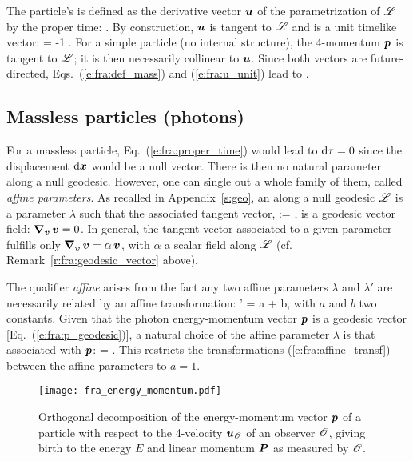 The particle's  is defined as the
derivative vector $\bm{u}$ of the parametrization of
$\mathscr{L}$ by the proper time:
\be \label{e:fra:def_u}
    .
\ee
By construction, $\bm{u}$ is tangent to $\mathscr{L}$ and is a unit timelike vector:
\be \label{e:fra:u_unit}
    \cdot{} = -1 .
\ee
For a simple particle (no internal structure),
the 4-momentum $\bm{p}$ is tangent to $\mathscr{L}$; it is then necessarily
collinear to $\bm{u}$. Since both vectors are future-directed,
Eqs.~(\ref{e:fra:def_mass}) and (\ref{e:fra:u_unit}) lead to
\be \label{e:fra:p_m_u}
   .
\ee

\subsection{Massless particles (photons)}

For a massless particle, Eq.~(\ref{e:fra:proper_time}) would lead to $\mathrm{d}\tau=0$
since the displacement $\mathrm{d}\bm{x}$ would be a null vector. There is then no natural parameter
along a null geodesic. However, one can single out a whole family of them,
called \emph{affine parameters}.
As recalled in Appendix~\ref{s:geo},
an 
along a null geodesic $\mathscr{L}$ is a parameter $\lambda$ such that
the associated tangent vector,
\be
     :=  ,
\ee
is a geodesic vector field: $\bm{\nabla}_{\bm{v}} \, \bm{v} = 0$. In general,
the tangent vector associated to a given parameter fulfills only
$\bm{\nabla}_{\bm{v}} \, \bm{v} = \alpha \, \bm{v}$, with $\alpha$ a scalar field
along $\mathscr{L}$ (cf. Remark~\ref{r:fra:geodesic_vector} above).

The qualifier \emph{affine} arises from the fact any two affine parameters
$\lambda$ and $\lambda'$ are necessarily related by an affine transformation:
\be \label{e:fra:affine_transf}
    \lambda' = a \lambda + b,
\ee
with $a$ and $b$ two constants.
Given that the photon energy-momentum vector $\bm{p}$ is a geodesic vector
[Eq.~(\ref{e:fra:p_geodesic})],
a natural choice of the affine parameter $\lambda$ is that associated with
$\bm{p}$:
\be \label{e:fra:p_dxdl}
     =  .
\ee
This restricts the transformations (\ref{e:fra:affine_transf}) between the
affine parameters to $a=1$.


\begin{figure}
\centerline{\texttt{[image: fra\_energy\_momentum.pdf]}}
\caption[]{\label{f:fra:energy_momentum} \footnotesize
Orthogonal decomposition of the energy-momentum vector $\bm{p}$ of a particle
with respect to the 4-velocity $\bm{u}_{\mathscr{O}}$ of an observer $\mathscr{O}$,
giving birth to the energy $E$ and linear momentum $\bm{P}$ as measured by $\mathscr{O}$.}
\end{figure}



